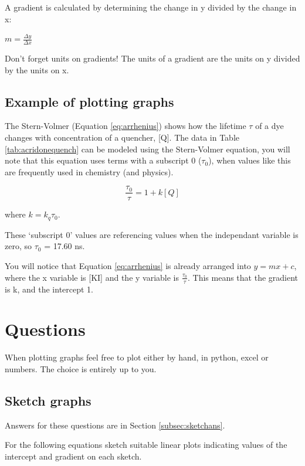 \documentclass[
]{book}
\begin{document}
A gradient is calculated by determining the change in y divided by the change in x:

\(m= \frac{\Delta y}{\Delta x}\)

Don't forget units on gradients! The units of a gradient are the units on y divided by the units on x.

\hypertarget{subsec:example}{%
\subsection{Example of plotting graphs}\label{subsec:example}}

The Stern-Volmer (Equation \eqref{eq:arrhenius}) shows how the lifetime \(\tau\) of a dye changes with concentration of a quencher, {[}Q{]}. The data in Table \ref{tab:acridonequench} can be modeled using the Stern-Volmer equation, you will note that this equation uses terms with a subscript 0 (\(\tau_0\)), when values like this are frequently used in chemistry (and physics).

\begin{equation}
\frac{\tau_0}{\tau}=1+k[Q]
\label{eq:sternvolment}
\end{equation}

where \(k = k_q \tau_0\).

These `subscript 0' values are referencing values when the independant variable is zero, so \(\tau_0\) = 17.60 ns.

You will notice that Equation \eqref{eq:arrhenius} is already arranged into \(y=mx+c\), where the x variable is {[}KI{]} and the y variable is \(\frac{\tau_0}{\tau}\). This means that the gradient is k, and the intercept 1.

\hypertarget{sec:Questions3}{%
\section{Questions}\label{sec:Questions3}}

When plotting graphs feel free to plot either by hand, in python, excel or numbers. The choice is entirely up to you.

\hypertarget{subsec:sketch}{%
\subsection{Sketch graphs}\label{subsec:sketch}}

Answers for these questions are in Section \ref{subsec:sketchans}.

For the following equations sketch suitable linear plots indicating values of the intercept and gradient on each sketch.
\end{document}
